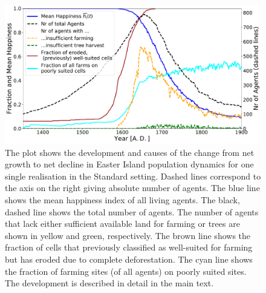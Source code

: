 \begin{figure}
	\centering
	\includegraphics[width=\textwidth]{images/Results/Standard/StandardsecondaryStats}
	\caption{The plot shows the development and causes of the change from net growth to net decline in Easter Island population dynamics for one single realisation in the Standard setting.
	Dashed lines correspond to the axis on the right giving absolute number of agents.
	The blue line shows the mean happiness index of all living agents. The black, dashed line shows the total number of agents. The number of agents that lack either sufficient available land for farming or trees are shown in yellow and green, respectively. The brown line shows the fraction of cells that previously classified as well-suited for farming but has eroded due to complete deforestation. The cyan line shows the fraction of farming sites (of all agents) on poorly suited sites.
	The development is described in detail in the main text.}
	\label{fig:STDsecondayrstats}
\end{figure}




